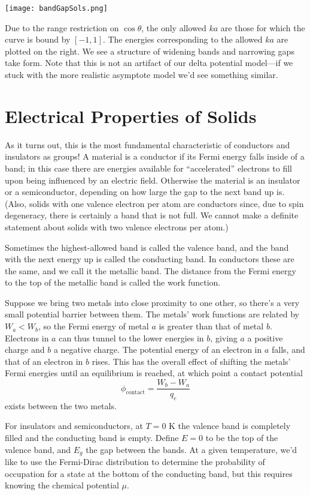 \documentclass[../p052main.tex]{subfiles}
\begin{document}
\begin{center}
    \texttt{[image: bandGapSols.png]}
\end{center}

Due to the range restriction on $\cos \theta$, the only allowed $ka$ are those for which the curve is bound by $[-1, 1]$.
The energies corresponding to the allowed $ka$ are plotted on the right.
We see a structure of widening bands and narrowing gaps take form.
Note that this is not an artifact of our delta potential model---if we stuck with the more realistic asymptote model we'd see something similar.

\section{Electrical Properties of Solids}
As it turns out, this is the most fundamental characteristic of conductors and insulators as groups!
A material is a conductor if its Fermi energy falls inside of a band; in this case there are energies available for ``accelerated'' electrons to fill upon being influenced by an electric field.
Otherwise the material is an insulator or a semiconductor, depending on how large the gap to the next band up is.
(Also, solids with one valence electron per atom are conductors since, due to spin degeneracy, there is certainly a band that is not full.
We cannot make a definite statement about solids with two valence electrons per atom.)

Sometimes the highest-allowed band is called the valence band, and the band with the next energy up is called the conducting band.
In conductors these are the same, and we call it the metallic band.
The distance from the Fermi energy to the top of the metallic band is called the work function.

Suppose we bring two metals into close proximity to one other, so there's a very small potential barrier between them.
The metals' work functions are related by $W_a < W_b$, so the Fermi energy of metal $a$ is greater than that of metal $b$.
Electrons in $a$ can thus tunnel to the lower energies in $b$, giving $a$ a positive charge and $b$ a negative charge.
The potential energy of an electron in $a$ falls, and that of an electron in $b$ rises.
This has the overall effect of shifting the metals' Fermi energies until an equilibrium is reached, at which point a contact potential
\[ \phi_\textrm{contact} = \frac{W_b - W_a}{q_e} \]
exists between the two metals.

For insulators and semiconductors, at $T = 0 \textrm{ K}$ the valence band is completely filled and the conducting band is empty.
Define $E=0$ to be the top of the valence band, and $E_g$ the gap between the bands.
At a given temperature, we'd like to use the Fermi-Dirac distribution to determine the probability of occupation for a state at the bottom of the conducting band, but this requires knowing the chemical potential $\mu$.
\end{document}
